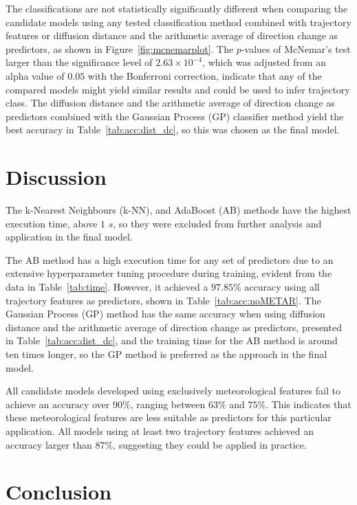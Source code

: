 \let\LaTeXcline\cline\documentclass[sn-mathphys-num]{sn-jnl}\let\cline\LaTeXcline
\begin{document}
The classifications are not statistically significantly different when comparing the candidate models using any tested classification method combined with trajectory features or diffusion distance and the arithmetic average of direction change as predictors, as shown in Figure~\ref{fig:mcnemarplot}. The $p$-values of McNemar's test larger than the significance level of $2.63 \times 10 ^{-4}$, which was adjusted from an alpha value of $0.05$ with the Bonferroni correction, indicate that any of the compared models might yield similar results and could be used to infer trajectory class. The diffusion distance and the arithmetic average of direction change as predictors combined with the Gaussian Process (GP) classifier method yield the best accuracy in Table~\ref{tab:acc:dist_dc}, so this was chosen as the final model.

\section{Discussion}
\label{sec:Discussion}

The k-Nearest Neighbours (k-NN), and AdaBoost (AB) methods have the highest execution time, above $1$ $s$, so they were excluded from further analysis and application in the final model.

The AB method has a high execution time for any set of predictors due to an extensive hyperparameter tuning procedure during training, evident from the data in Table~\ref{tab:time}. However, it achieved a $97.85\%$ accuracy using all trajectory features as predictors, shown in Table~\ref{tab:acc:noMETAR}. The Gaussian Process (GP) method has the same accuracy when using diffusion distance and the arithmetic average of direction change as predictors, presented in Table~\ref{tab:acc:dist_dc}, and the training time for the AB method is around ten times longer, so the GP method is preferred as the approach in the final model.

All candidate models developed using exclusively meteorological features fail to achieve an accuracy over $90\%$, ranging between $63\%$ and $75\%$. This indicates that these meteorological features are less suitable as predictors for this particular application. All models using at least two trajectory features achieved an accuracy larger than $87\%$, suggesting they could be applied in practice.

\section{Conclusion}
\label{sec:Conclusion}
\end{document}
